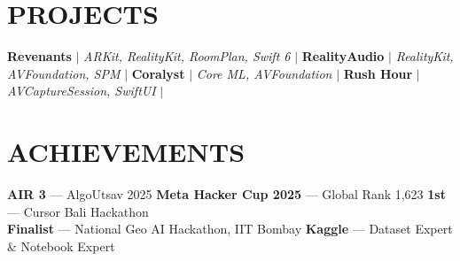 \section{PROJECTS}
    \resumeSubHeadingListStart
        \resumeProjectHeading
          {\textbf{Revenants} $|$ \emph{ARKit, RealityKit, RoomPlan, Swift 6} $|$ \href{https://github.com/bhanage-viraj/Split-Mechanics}{} \hspace{2pt} \href{https://testflight.apple.com/join/bxqH2nP9}{}}{}
          \resumeItemListStart
          \resumeItemListEnd
        \resumeProjectHeading
          {\textbf{RealityAudio} $|$ \emph{RealityKit, AVFoundation, SPM} $|$ \href{https://github.com/bhanage-viraj/RealityAudio}{}}{}
          \resumeItemListStart
          \resumeItemListEnd
        \resumeProjectHeading
          {\textbf{Coralyst} $|$ \emph{Core ML, AVFoundation} $|$ \href{https://github.com/Gleenryan/CH5_Biorocks}{} \hspace{2pt} \href{https://coralyst.vercel.app}{}}{}
          \resumeItemListStart
          \resumeItemListEnd
        \resumeProjectHeading
          {\textbf{Rush Hour} $|$ \emph{AVCaptureSession, SwiftUI} $|$ \href{https://github.com/bhanage-viraj/RushHour}{}}{}
          \resumeItemListStart
          \resumeItemListEnd
    \resumeSubHeadingListEnd

\section{ACHIEVEMENTS}
 \begin{itemize}[leftmargin=0in, label={}, itemsep=0pt, topsep=1pt]
    \small{\item{
     \textbf{AIR 3} --- AlgoUtsav 2025 \hspace{8pt} \textbf{Meta Hacker Cup 2025} --- Global Rank 1,623 \hspace{8pt} \textbf{1st} --- Cursor Bali Hackathon \\
     \textbf{Finalist} --- National Geo AI Hackathon, IIT Bombay \hspace{8pt} \textbf{Kaggle} --- Dataset Expert \& Notebook Expert
    }}
 \end{itemize}

